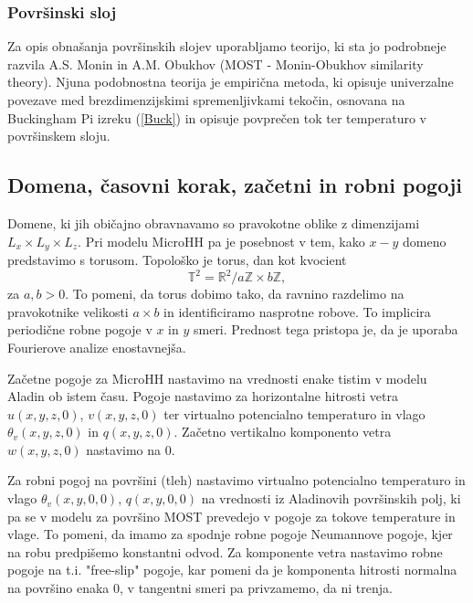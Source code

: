 \documentclass[mat2, tisk]{fmfdelo}
\newcommand{\Z}{\mathbb Z}
\begin{document}
\subsubsection{Površinski sloj}
Za opis obnašanja površinskih slojev uporabljamo teorijo, ki sta jo podrobneje razvila A.S. 
Monin in A.M. Obukhov\cite{monin1954most} (MOST - Monin-Obukhov similarity theory). Njuna podobnostna teorija
je empirična metoda, ki opisuje univerzalne povezave med 
brezdimenzijskimi spremenljivkami tekočin, osnovana na 
Buckingham Pi izreku (\ref{Buck}) in opisuje 
povprečen tok ter temperaturo v površinskem sloju.

\subsection{Domena, časovni korak, začetni in robni pogoji}

Domene, ki jih običajno obravnavamo so pravokotne oblike z dimenzijami
$L_x \times L_y \times L_z$. Pri modelu MicroHH pa je posebnost v tem, kako
$x-y$ domeno predstavimo s torusom. Topološko je torus, dan 
kot kvocient 
$$\mathbb{T}^2 = \mathbb{R}^2 / {a\Z \times b\Z},$$ 
za $a, b > 0$. To pomeni, da torus dobimo tako, da ravnino razdelimo 
na pravokotnike velikosti $a \times b$ in identificiramo
nasprotne robove. To implicira periodične robne pogoje v $x$ in $y$ smeri.
Prednost tega pristopa je, da je uporaba Fourierove analize enostavnejša.

Začetne pogoje za MicroHH nastavimo na vrednosti enake tistim 
v modelu Aladin ob istem času. Pogoje nastavimo za horizontalne 
hitrosti vetra $u(x,y,z,0)$, $v(x,y,z,0)$ ter virtualno potencialno 
temperaturo in vlago $\theta_v(x,y,z,0)$ in 
$q(x,y,z,0)$. Začetno vertikalno komponento vetra $w(x,y,z,0)$ nastavimo na $0$.

Za robni pogoj na površini (tleh) nastavimo virtualno potencialno
temperaturo in vlago $\theta_v(x,y,0,0)$, $q(x,y,0,0)$ na vrednosti 
iz Aladinovih površinskih polj, ki pa se v modelu za površino 
MOST prevedejo v pogoje za tokove temperature in vlage. To 
pomeni, da imamo za spodnje robne pogoje Neumannove pogoje, 
kjer na robu predpišemo konstantni odvod. Za komponente vetra 
nastavimo robne pogoje na t.i. "free-slip" pogoje, kar pomeni da 
je komponenta hitrosti normalna na površino enaka 0, v tangentni
smeri pa privzamemo, da ni trenja.
\end{document}
